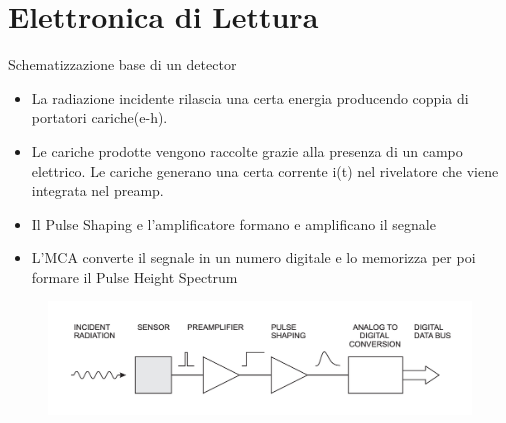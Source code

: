 \documentclass{beamer}
\begin{document}
\section{Elettronica di Lettura}

\begin{frame}{Schematizzazione base di un detector}
\begin{itemize}
    \item La radiazione incidente rilascia una certa energia producendo coppia di portatori cariche(e-h). 
    \item Le cariche prodotte vengono raccolte grazie alla presenza di un campo elettrico. Le cariche generano una certa corrente i(t) nel rivelatore che viene integrata nel preamp.
    \item Il Pulse Shaping e l'amplificatore formano e amplificano il segnale
    \item L'MCA converte il segnale in un numero digitale e lo memorizza per poi formare il Pulse Height Spectrum
\end{itemize}
\begin{figure}
\includegraphics[width=\textwidth]{images/basic_detector_function.png}
\end{figure}


\end{frame}
\end{document}
